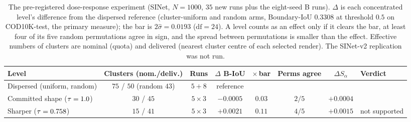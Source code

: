 \begin{table}[h]
\caption{The pre-registered dose-response experiment (SINet, $N = 1000$, $35$ new runs plus the eight-seed B runs).
$\Delta$ is each concentrated level's difference from the dispersed reference (cluster-uniform and random arms,
Boundary-IoU $0.3308$ at threshold $0.5$ on COD10K-test, the primary measure); the bar is $2\hat\sigma = 0.0193$
($\mathrm{df} = 24$). A level counts as an effect only if it clears the bar, at least four of its five random permutations
agree in sign, and the spread between permutations is smaller than the effect. Effective numbers of clusters are
nominal (quota) and delivered (nearest cluster centre of each selected render). The SINet-v2 replication was not run.}
\label{tab:cdr}
\begin{center}
\scriptsize
\setlength{\tabcolsep}{4pt}
\begin{tabular}{@{}lccccccl@{}}
\toprule
Level & Clusters (nom./deliv.) & Runs & $\Delta$ B-IoU & $\times$\,bar & Perms agree & $\Delta S_\alpha$ & Verdict \\
\midrule
Dispersed (uniform, random) & $75$ / $50$ (random $43$) & $5 + 8$ & reference & & & & \\
Committed shape ($\tau = 1.0$) & $30$ / $45$ & $5 \times 3$ & $-0.0005$ & $0.03$ & $2/5$ & $+0.0004$ & \\
Sharper ($\tau = 0.758$) & $15$ / $41$ & $5 \times 3$ & $+0.0021$ & $0.11$ & $4/5$ & $+0.0015$ & not supported \\
\bottomrule
\end{tabular}
\end{center}
\end{table}
